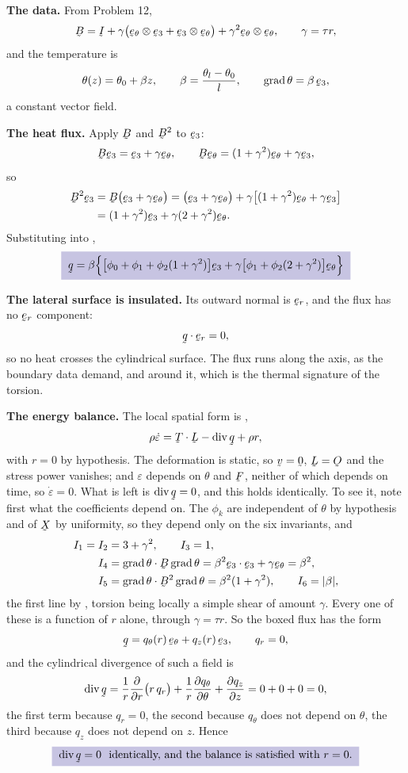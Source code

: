 \begin{solution}
\textbf{The data.} From Problem 12,
\[
   \bB=\I+\gamma\big(\bet\otimes\be_{3}+\be_{3}\otimes\bet\big)
   +\gamma^{2}\bet\otimes\bet,\qquad \gamma=\tau r ,
\]
and the temperature is
\[
   \theta(z)=\theta_{0}+\beta z,\qquad
   \beta=\frac{\theta_{l}-\theta_{0}}{l},\qquad
   \grad\theta=\beta\,\be_{3},
\]
a constant vector field.

\textbf{The heat flux.} Apply $\bB$ and $\bB^{2}$ to $\be_{3}$:
\[
   \bB\be_{3}=\be_{3}+\gamma\bet,\qquad
   \bB\bet=(1+\gamma^{2})\bet+\gamma\be_{3},
\]
so
\[
\begin{aligned}
   \bB^{2}\be_{3}&=\bB\big(\be_{3}+\gamma\bet\big)
   =\big(\be_{3}+\gamma\bet\big)
   +\gamma\big[(1+\gamma^{2})\bet+\gamma\be_{3}\big]\\
   &=(1+\gamma^{2})\be_{3}+\gamma(2+\gamma^{2})\bet .
\end{aligned}
\]
Substituting into ,
\[
   \boxed{\;\bq=\beta\Big\{\big[\phi_{0}+\phi_{1}
   +\phi_{2}(1+\gamma^{2})\big]\be_{3}
   +\gamma\big[\phi_{1}+\phi_{2}(2+\gamma^{2})\big]\bet\Big\}\;}
\]

\textbf{The lateral surface is insulated.} Its outward normal is
$\ber$, and the flux has no $\ber$ component:
\[
   \ip\bq\ber=0 ,
\]
so no heat crosses the cylindrical surface. The flux runs along the
axis, as the boundary data demand, and around it, which is the
thermal signature of the torsion.

\textbf{The energy balance.} The local spatial form is ,
\[
   \rho\dot\varepsilon=\bT\cdot\bL-\dvg\bq+\rho r ,
\]
with $r=0$ by hypothesis. The deformation is static, so $\bv=\bze$,
$\bL=\Ob$ and the stress power vanishes; and $\varepsilon$ depends on
$\theta$ and $\bF$, neither of which depends on time, so
$\dot\varepsilon=0$. What is left is $\dvg\bq=0$, and this holds
identically. To see it, note first what the coefficients depend on. The
$\phi_{k}$ are independent of $\theta$ by hypothesis and of $\bX$ by
uniformity, so they depend only on the six invariants, and
\[
\begin{aligned}
   I_{1}=I_{2}&=3+\gamma^{2},\qquad I_{3}=1,\\
   I_{4}&=\ip{\grad\theta}{\bB\grad\theta}=\beta^{2}
   \ip{\be_{3}}{\be_{3}+\gamma\bet}=\beta^{2},\\
   I_{5}&=\ip{\grad\theta}{\bB^{2}\grad\theta}
   =\beta^{2}(1+\gamma^{2}),\qquad I_{6}=|\beta| ,
\end{aligned}
\]
the first line by , torsion being locally a simple shear of
amount $\gamma$. Every one of these is a function of $r$ alone, through
$\gamma=\tau r$. So the boxed flux has the form
\[
   \bq=q_{\theta}(r)\,\bet+q_{z}(r)\,\be_{3},\qquad q_{r}=0 ,
\]
and the cylindrical divergence of such a field is
\[
   \dvg\bq=\frac{1}{r}\frac{\partial}{\partial r}\big(r\,q_{r}\big)
   +\frac{1}{r}\frac{\partial q_{\theta}}{\partial\theta}
   +\frac{\partial q_{z}}{\partial z}
   =0+0+0=0 ,
\]
the first term because $q_{r}=0$, the second because $q_{\theta}$ does
not depend on $\theta$, the third because $q_{z}$ does not depend on
$z$. Hence
\[
   \boxed{\;\dvg\bq=0\ \text{ identically, and the balance is
   satisfied with }r=0 .\;}
\]


\end{solution}
